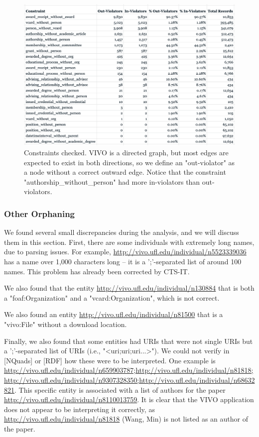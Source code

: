 \documentclass[11pt]{article}
\begin{document}
\begin{figure}[h!]
\centering
\includegraphics[width=\textwidth]{violators.png}
\caption{Constraints checked. VIVO is a directed graph, but most edges are expected to exist in both directions, so we define an "out-violator" as a node without a correct outward edge. Notice that the constraint "authorship\_without\_person" had more in-violators than out-violators.}
\label{fig:output}
\end{figure}

\subsubsection*{Other Orphaning}
We found several small discrepancies during the analysis, and we will discuss them in this section. First, there are some individuals with extremely long names, due to parsing issues. For example, \url{http://vivo.ufl.edu/individual/n5523339036} has a name over 1,000 characters long -- it is a ';'-separated list of around 100 names. This problem has already been corrected by CTS-IT.

We also found that the entity \url{http://vivo.ufl.edu/individual/n130884} that is both a "foaf:Organization" and a "vcard:Organization", which is not correct.

We also found an entity \url{http://vivo.ufl.edu/individual/n81500} that is a "vivo:File" without a download location.

Finally, we also found that some entities had URIs that were not single URIs but a ';'-separated list of URIs (i.e., "<uri;uri;uri...>"). We could not verify in [NQuads] or [RDF] how these were to be interpreted. One example is \url{http://vivo.ufl.edu/individual/n659903787;http://vivo.ufl.edu/individual/n81818;http://vivo.ufl.edu/individual/n9307328350;http://vivo.ufl.edu/individual/n68632821}. This specific entity is associated with a list of authors for the paper \url{http://vivo.ufl.edu/individual/n8110013759}. It is clear that the VIVO application does not appear to be interpreting it correctly, as \url{http://vivo.ufl.edu/individual/n81818} (Wang, Min) is not listed as an author of the paper.
\end{document}
